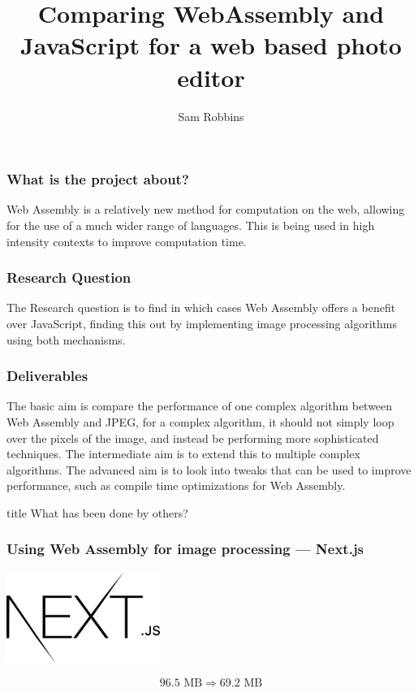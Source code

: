 \documentclass{beamer}
\title{Comparing WebAssembly and JavaScript for a web based photo editor}
\author{Sam Robbins}
\institute{Durham University}
\date{}
\begin{document}
\frame{\titlepage}

\begin{frame}
    \frametitle{What is the project about?}
    Web Assembly is a relatively new method for computation on the web, allowing for the use of a much wider range of languages. This is being used in high intensity contexts to improve computation time.
\end{frame}

\begin{frame}
    \frametitle{Research Question}
    The Research question is to find in which cases Web Assembly offers a benefit over JavaScript, finding this out by implementing image processing algorithms using both mechanisms.
\end{frame}

\begin{frame}
    \frametitle{Deliverables}
    The basic aim is compare the performance of one complex algorithm between Web Assembly and JPEG, for a complex algorithm, it should not simply loop over the pixels of the image, and instead be performing more sophisticated techniques. The intermediate aim is to extend this to multiple complex algorithms. The advanced aim is to look into tweaks that can be used to improve performance, such as compile time optimizations for Web Assembly.
\end{frame}

\begin{frame}
    \vfill
    \centering
    \begin{beamercolorbox}[sep=8pt,center,shadow=true,rounded=true]{title}
        What has been done by others?\par%
    \end{beamercolorbox}
    \vfill
\end{frame}

\begin{frame}
    \frametitle{Using Web Assembly for image processing — Next.js}
    \begin{center}
        \includegraphics[width=5cm]{nextjs.png}

    \end{center}

    $$
        96.5 \text{ MB} \Rightarrow 69.2 \text{ MB}
    $$
\end{frame}
\end{document}
